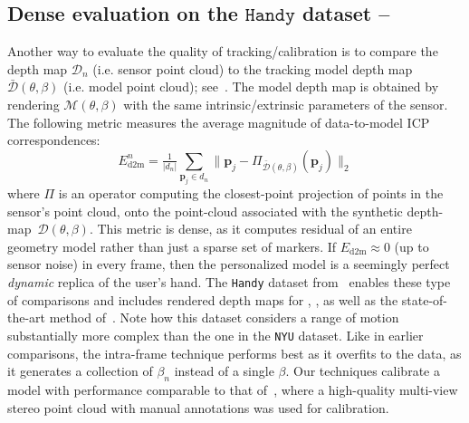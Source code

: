 \subsection{Dense evaluation on the $\texttt{Handy}$ dataset -- }
\label{sec:evalhandy}
Another way to evaluate the quality of tracking/calibration is to compare the depth map $\mathcal{D}_n$ (i.e. sensor point cloud) to the tracking model depth map $\mathcal{\bar{D}}(\theta,\beta)$ (i.e. model point cloud); see~\cite{tkach2016sphere}. The model depth map is obtained by rendering $\mathcal{M}(\theta,\beta)$ with the same intrinsic/extrinsic parameters of the sensor. The following metric measures the average magnitude of data-to-model ICP correspondences:
% 
\begin{equation}
E_\text{d2m}^n = \tfrac{1}{|d_n|} \sum_{\mathbf{p}_j \in d_n} \| \mathbf{p}_j - \Pi_{\mathcal{\bar{D}}(\theta,\beta)}(\mathbf{p}_j) \|_2
\label{eq:metricd2m}
\end{equation}
% 
where $\Pi$ is an operator computing the closest-point projection of points in the sensor's point cloud, onto the point-cloud associated with the synthetic depth-map~$\mathcal{D}(\theta,\beta)$. This metric is dense, as it computes residual of an entire geometry model rather than just a sparse set of markers. 
If $E_\text{d2m}\approx0$ (up to sensor noise) in every frame, then the personalized model is a seemingly perfect \emph{dynamic} replica of the user's hand. The \texttt{Handy} dataset from~\cite{tkach2016sphere} enables these type of comparisons and includes rendered depth maps for \cite{htrack}, \cite{sharp2015accurate}, as well as the state-of-the-art method of~\cite{taylor2016joint}. Note how this dataset considers a range of motion substantially more complex than the one in the \texttt{NYU} dataset.
% 
Like in earlier comparisons, the intra-frame technique performs best as it overfits to the data, as it generates a collection of $\beta_n$ instead of a single $\beta$. Our techniques calibrate a model with performance comparable to that of~\cite{tkach2016sphere}, where a high-quality multi-view stereo point cloud with manual annotations was used for calibration. 
